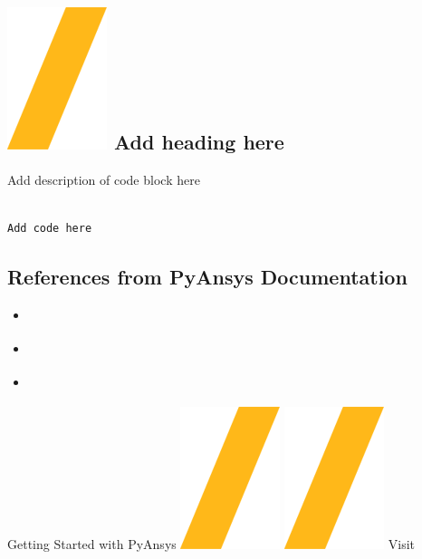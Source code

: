 \documentclass[9pt,landscape]{article}
\begin{document}
\begin{multicols}{3}
\section{\includegraphics[height=\fontcharht\font`\S]{slash.png}  Add heading here}
Add description of code block here
\begin{lstlisting}[language=Python]

Add code here

\end{lstlisting}


\subsection{References from PyAnsys Documentation}
\begin{itemize}
\item \href{usefullinks}{\color{blue}{name of link}}
\item \href{useful_links}{\color{blue}{name of link}}
\item \href{useful_links}{\color{blue}{name of link}}
\end{itemize}
\end{multicols}

\vspace{-0.15cm}
\noindent\makebox[\linewidth]{\rule{\paperwidth}{4pt}}
\begin{center}
Getting Started with PyAnsys \includegraphics[height=\fontcharht\font`\S]{slash.png} \href{https://github.com/pyansys}{\color{blue}{PyAnsys on GitHub}} \includegraphics[height=\fontcharht\font`\S]{slash.png} Visit 
\end{center}
\end{document}

